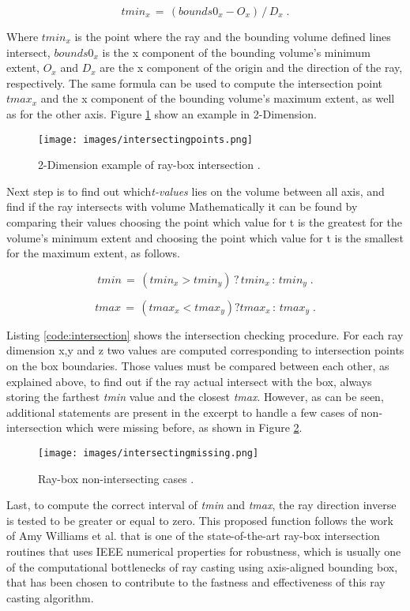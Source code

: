 \documentclass[12pt,a4paper]{extarticle}
\newcommand{\linespace}{\vspace{0pt}}
\begin{document}
\[
tmin_{x}\,=\,(bounds0_{x} - O_{x})\,/\,D_{x} \;.
\] 

Where $tmin_{x}$ is the point where the ray and the bounding volume defined lines intersect, $bounds0_{x}$ is the x component of the bounding volume's minimum extent, $O_{x}$ and $D_{x}$ are the x component of the origin and the direction of the ray, respectively. The same formula can be used to compute the intersection point $tmax_{x}$ and the x component of the bounding volume's maximum extent, as well as for the other axis. Figure \ref{fig:intersectingpoints} show an example in 2-Dimension.

\begin{figure}[hbtp]
\centering
\texttt{[image: images/intersectingpoints.png]}
\caption{2-Dimension example of ray-box intersection \cite{Scratchapixel2014Aug}.}
\label{fig:intersectingpoints}
\end{figure}

Next step is to find out which\textit{t-values} lies on the volume between all axis, and find if the ray intersects with volume Mathematically it can be found by comparing their values choosing the point which value for t is the greatest for the volume's minimum extent and choosing the point which value for t is the smallest for the maximum extent, as follows.

\[
tmin\, =\, (tmin_{x} > tmin_{y})\, ?\, tmin_{x} \,:\, tmin_{y} \;.
\]

\[
tmax\, =\, (tmax_{x} < tmax_{y}) ? tmax_{x} \,:\, tmax_{y} \;.
\]


Listing \ref{code:intersection} shows the intersection checking procedure. For each ray dimension x,y and z two values are computed corresponding to intersection points on the box boundaries. Those values must be compared between each other, as explained above, to find out if the ray actual intersect with the box, always storing the farthest \textit{tmin} value and the closest \textit{tmax}.
However, as can be seen, additional statements are present in the excerpt to handle a few cases of non-intersection which were missing before, as shown in Figure \ref{fig:intersectionmissing}.
\linespace

\begin{figure}[hbtp]
\centering
\texttt{[image: images/intersectingmissing.png]}
\caption{Ray-box non-intersecting cases \cite{Scratchapixel2014Aug}.}
\label{fig:intersectionmissing}
\end{figure}


Last, to compute the correct interval of \textit{tmin} and \textit{tmax}, the ray direction inverse is tested to be greater or equal to zero. This proposed function follows the work of Amy Williams et al. \cite{Williams:2005} that is one of the state-of-the-art ray-box intersection routines that uses IEEE numerical properties for robustness, which is usually one of the computational bottlenecks of ray casting using axis-aligned bounding box, that has been chosen to contribute to the fastness and effectiveness of this ray casting algorithm.
\end{document}
